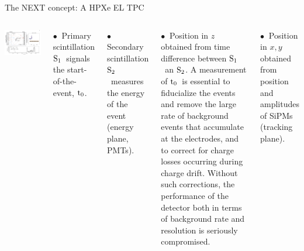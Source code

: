 \documentclass [aspectratio=169]{beamer}
\newcommand{\so}{\ensuremath{\rm S_1}}
\newcommand{\st}{\ensuremath{\rm S_2}}
\newcommand{\tz}{\ensuremath{\rm t_0}}
\begin{document}
\begin{frame}{The NEXT concept: A HPXe EL TPC}

\begin{columns}
\includegraphics[scale=0.20]{nextpo.png}

$\bullet~$ Primary scintillation \so\ signals the start-of-the-event, \tz.

$\bullet~$ Secondary scintillation \st\  measures the energy of the event (energy plane, PMTs).

$\bullet~$ Position in $z$ obtained from time difference between \so\ an \st. A measurement of \tz\ is essential to fiducialize the events and remove the large rate of background events that accumulate at the electrodes, and to correct for charge losses occurring during charge drift. Without such corrections, the performance of the detector both in terms of background rate and resolution is seriously compromised.

 $\bullet~$ Position in $x,y$ obtained from position and amplitudes of SiPMs (tracking plane).
 \end{columns}
\end{frame}

\end{document}
